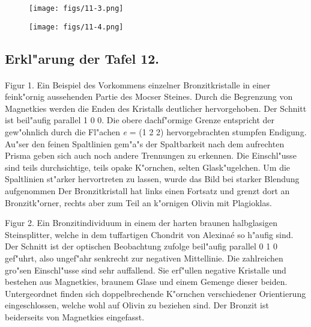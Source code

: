 \documentclass[a4paper, 11pt, oneside, polutonikogreek, german]{article}
\begin{document}
\vspace*{\fill}
\begin{figure}[H]
\centering
\texttt{[image: figs/11-3.png]}
\caption{}
\end{figure}
\vspace*{\fill}
\clearpage

\vspace*{\fill}
\begin{figure}[H]
\centering
\texttt{[image: figs/11-4.png]}
\caption{}
\end{figure}
\vspace*{\fill}
\clearpage

\subsection{Erkl"arung der Tafel 12.}
\paragraph{}
Figur 1. Ein Beispiel des Vorkommens einzelner Bronzitkristalle in einer feink"ornig aussehenden Partie des Mocser Steines. Durch die Begrenzung von Magnetkies werden die Enden des Kristalls deutlicher hervorgehoben. Der Schnitt ist beil"aufig parallel 1 0 0. Die obere dachf"ormige Grenze entspricht der gew"ohnlich durch die Fl"achen \emph{e} = (1 2 2) hervorgebrachten stumpfen Endigung. Au"ser den feinen Spaltlinien gem"a"s der Spaltbarkeit nach dem aufrechten Prisma geben sich auch noch andere Trennungen zu erkennen. Die Einschl"usse sind teils durchsichtige, teils opake K"ornchen, selten Glask"ugelchen. Um die Spaltlinien st"arker hervortreten zu lassen, wurde das Bild bei starker Blendung aufgenommen Der Bronzitkristall hat links einen Fortsatz und grenzt dort an Bronzitk"orner, rechts aber zum Teil an k"ornigen Olivin mit Plagioklas.

Figur 2. Ein Bronzitindividuum in einem der harten braunen halbglasigen Steinsplitter, welche in dem tuffartigen Chondrit von Alexinaé so h"aufig sind. Der Schnitt ist der optischen Beobachtung zufolge beil"aufig parallel 0 1 0 gef"uhrt, also ungef"ahr senkrecht zur negativen Mittellinie. Die zahlreichen gro"sen Einschl"usse sind sehr auffallend. Sie erf"ullen negative Kristalle und bestehen aus Magnetkies, braunem Glase und einem Gemenge dieser beiden. Untergeordnet finden sich doppelbrechende K"ornchen verschiedener Orientierung eingeschlossen, welche wohl auf Olivin zu beziehen sind. Der Bronzit ist beiderseits von Magnetkies eingefasst.
\end{document}
